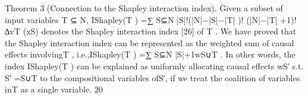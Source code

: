 Theorem 3 (Connection to the Shapley interaction index). Given a subset of input variables T ⊆ N, IShapley(T ) =∑
S⊆N\T
|S|!(|N|−|S|−|T| )!
(|N|−|T| +1)! ∆vT (xS) denotes the Shapley interaction index [26] of T . We have proved that the Shapley
interaction index can be represented as the weighted sum of causal effects involvingT , i.e.,IShapley(T ) =∑
S⊆N
|S|+1wS∪T .
In other words, the index IShapley(T ) can be explained as uniformly allocating causal effects wS′ s.t. S′ =S∪T to the
compositional variables ofS′, if we treat the coalition of variables inT as a single variable.
20
